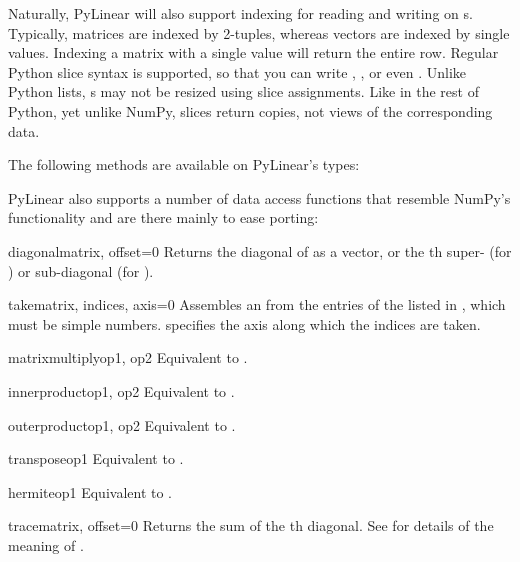Naturally, PyLinear will also support indexing for reading and writing
on s. Typically, matrices are indexed by 2-tuples,
whereas vectors are indexed by single values. Indexing a matrix with a
single value will return the entire row. Regular Python slice syntax
is supported, so that you can write , ,
or even . Unlike Python lists, s may not be
resized using slice assignments. Like in the rest of Python, yet
unlike NumPy, slices return copies, not views of the corresponding
data.

The following methods are available on PyLinear's  types:

PyLinear also supports a number of data access functions that resemble
NumPy's functionality and are there mainly to ease porting:

\begin{funcdesc}{diagonal}{matrix, offset=0}
  Returns the diagonal of  as a vector, or the th
  super- (for ) or sub-diagonal (for ).
\end{funcdesc}
\begin{funcdesc}{take}{matrix, indices, axis=0}
  Assembles an  from the entries of the 
  listed in , which must be simple numbers. 
  specifies the axis along which the indices are taken.
\end{funcdesc}
\begin{funcdesc}{matrixmultiply}{op1, op2}
  Equivalent to .
\end{funcdesc}
\begin{funcdesc}{innerproduct}{op1, op2}
  Equivalent to .
\end{funcdesc}
\begin{funcdesc}{outerproduct}{op1, op2}
  Equivalent to .
\end{funcdesc}
\begin{funcdesc}{transpose}{op1}
  Equivalent to .
\end{funcdesc}
\begin{funcdesc}{hermite}{op1}
  Equivalent to .
\end{funcdesc}
\begin{funcdesc}{trace}{matrix, offset=0}
  Returns the sum of the th diagonal. See 
  for details of the meaning of .
\end{funcdesc}
